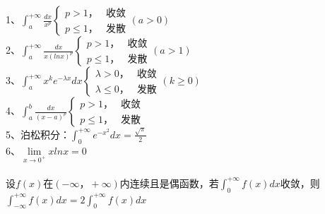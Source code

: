 \documentclass{article}
\begin{document}
\begin{flushleft}
	1、$\int_{a}^{+\infty}\frac{dx}{x^p}\left\{
	\begin{array}{lcl}
	p>1， & \mbox{收敛}\\
	p\le 1， & \mbox{发散}
	\end{array} \right.(a>0)$\\
	2、$\int_{a}^{+\infty}\frac{dx}{x(lnx)^p}\left\{
	\begin{array}{lcl}
	p>1， & \mbox{收敛}\\
	p\le 1， & \mbox{发散}
	\end{array} \right.(a>1)$\\
	3、$\int_{a}^{+\infty}x^ke^{-\lambda x}dx\left\{
	\begin{array}{lcl}
	\lambda>0， & \mbox{收敛}\\
	\lambda\le 0， & \mbox{发散}
	\end{array} \right.(k\ge 0)$\\
	4、$\int_{a}^{b}\frac{dx}{(x-a)^p}\left\{
	\begin{array}{lcl}
	p>1， & \mbox{收敛}\\
	p\le 1， & \mbox{发散}
	\end{array} \right.$\\
	5、泊松积分：$\int_{0}^{+\infty}e^{-x^2}dx=\frac{\sqrt{\pi}}{2}$\\
	6、$\lim\limits_{x\to 0^+}xlnx=0$\\
	~\\
	设$f(x)$在$(-\infty，+\infty)$内连续且是偶函数，若$\int_{0}^{+\infty}f(x)dx$收敛，则$\int_{-\infty}^{+\infty}f(x)dx=2\int_{0}^{+\infty}f(x)dx$\\
	
\end{flushleft}
\end{document}
